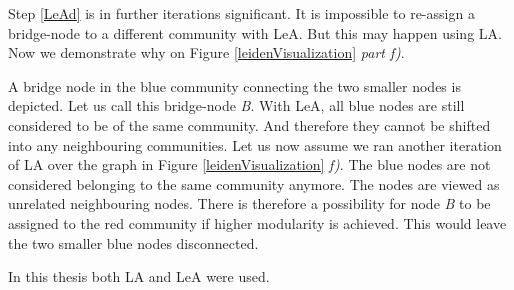 Step \ref{LeAd} is in further iterations significant.  It is impossible to re-assign a bridge-node to a different community with LeA. But this may happen using LA. Now we demonstrate why on Figure \ref{leidenVisualization} \textit{part f)}. 

A bridge node in the blue community connecting the two smaller nodes is depicted. Let us call this bridge-node \textit{B}. With LeA, all blue nodes are still considered to be of the same community. And therefore they cannot be shifted into any neighbouring communities. Let us now assume we ran another iteration of LA over the graph in Figure \ref{leidenVisualization} \textit{f)}. The blue nodes are not considered belonging to the same community anymore. The nodes are viewed as unrelated neighbouring nodes. There is therefore a possibility for node \textit{B} to be assigned to the red community if higher modularity is achieved. This would leave the two smaller blue nodes disconnected. 

In this thesis both LA and LeA were used.